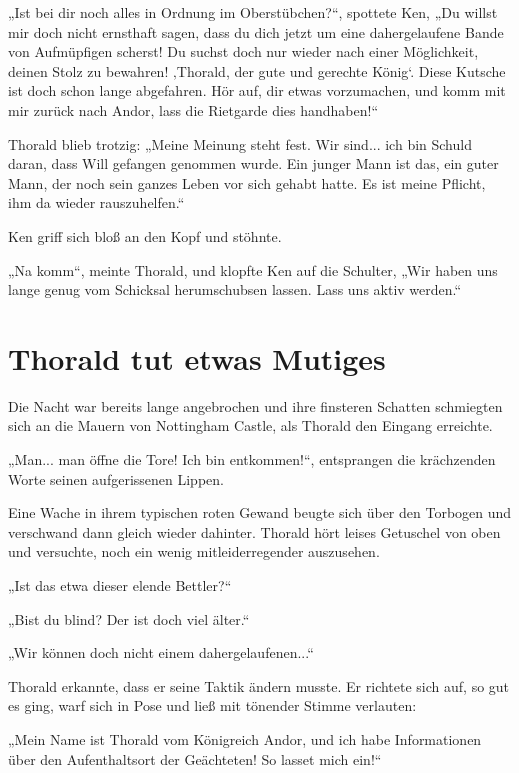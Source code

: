 „Ist bei dir noch alles in Ordnung im Oberstübchen?“, spottete Ken, „Du willst mir doch nicht ernsthaft sagen, dass du dich jetzt um eine dahergelaufene Bande von Aufmüpfigen scherst! Du suchst doch nur wieder nach einer Möglichkeit, deinen Stolz zu bewahren! ‚Thorald, der gute und gerechte König‘. Diese Kutsche ist doch schon lange abgefahren. Hör auf, dir etwas vorzumachen, und komm mit mir zurück nach Andor, lass die Rietgarde dies handhaben!“

Thorald blieb trotzig: „Meine Meinung steht fest. Wir sind... ich bin Schuld daran, dass Will gefangen genommen wurde. Ein junger Mann ist das, ein guter Mann, der noch sein ganzes Leben vor sich gehabt hatte. Es ist meine Pflicht, ihm da wieder rauszuhelfen.“

Ken griff sich bloß an den Kopf und stöhnte.

„Na komm“, meinte Thorald, und klopfte Ken auf die Schulter, „Wir haben uns lange genug vom Schicksal herumschubsen lassen. Lass uns aktiv werden.“








\newpage
\section{Thorald tut etwas Mutiges}

Die Nacht war bereits lange angebrochen und ihre finsteren Schatten schmiegten sich an die Mauern von Nottingham Castle, als Thorald den Eingang erreichte.

„Man... man öffne die Tore! Ich bin entkommen!“, entsprangen die krächzenden Worte seinen aufgerissenen Lippen.

Eine Wache in ihrem typischen roten Gewand beugte sich über den Torbogen und verschwand dann gleich wieder dahinter. Thorald hört leises Getuschel von oben und versuchte, noch ein wenig mitleiderregender auszusehen.

„Ist das etwa dieser elende Bettler?“

„Bist du blind? Der ist doch viel älter.“

„Wir können doch nicht einem dahergelaufenen...“

Thorald erkannte, dass er seine Taktik ändern musste. Er richtete sich auf, so gut es ging, warf sich in Pose und ließ mit tönender Stimme verlauten:

„Mein Name ist Thorald vom Königreich Andor, und ich habe Informationen über den Aufenthaltsort der Geächteten! So lasset mich ein!“

